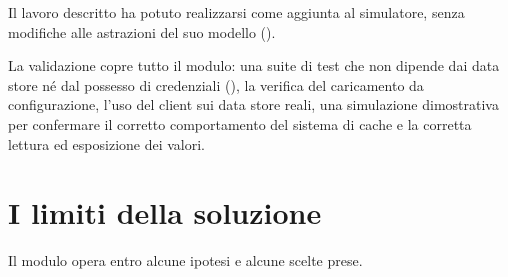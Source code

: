 Il lavoro descritto ha potuto realizzarsi come aggiunta
al simulatore, senza modifiche alle
astrazioni del suo modello ().

La validazione copre tutto il modulo: una suite di test
che non dipende dai data store né dal possesso di credenziali (),
la verifica del caricamento da configurazione, l'uso del client sui data
store reali, una simulazione dimostrativa per confermare il corretto comportamento
del sistema di cache e la corretta lettura ed esposizione dei valori.

\section{I limiti della soluzione}
\label{sec:limiti}

Il modulo opera entro alcune ipotesi e alcune scelte prese.

